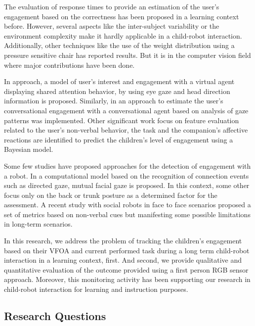 \documentclass{sig-alternate}
\begin{document}
The evaluation of response times to provide an estimation of the user's engagement based on the correctness has been proposed in a learning context \cite{Beck} before. However, several aspects like the inter-subject variability or the environment complexity make it hardly applicable in a child-robot interaction. Additionally, other techniques \cite{Chipman07postureas} like the use of the weight distribution using a pressure sensitive chair has reported results. But it is in the computer vision field where major contributions have been done. 

In \cite{peters2010investigating} approach, a model of user's interest and engagement with a virtual agent displaying shared attention behavior, by using eye gaze and head direction information is proposed. Similarly, in \cite{nakano2010estimating} an approach to estimate the user's conversational engagement with a conversational agent based on analysis of gaze patterns was implemented. Other significant work \cite{Castellano:2009} focus on feature evaluation related to the user's non-verbal behavior, the task and the companion's affective reactions are identified to predict the children's level of engagement using a Bayesian model.

Some few studies have proposed approaches for the detection of engagement with a robot. In \cite{Rich:2010} a computational model based on the recognition of connection events such
as directed gaze, mutual facial gaze is proposed. In this context, some other \cite{Sanghvi:2011} focus only on the back or trunk posture as a determined factor for the assessment. A recent study \cite{anzalone} with social robots in face to face scenarios proposed a set of metrics based on non-verbal cues but manifesting some possible limitations in long-term scenarios.

In this research, we address the problem of tracking the children's engagement based on their VFOA and current performed task during a long term child-robot interaction in a learning context, first. And second, we provide qualitative and quantitative evaluation of the outcome provided using a first person RGB sensor approach. Moreover, this monitoring activity has been supporting our research in child-robot interaction for learning and instruction purposes.
\vfill


\subsection{Research Questions}
\end{document}
